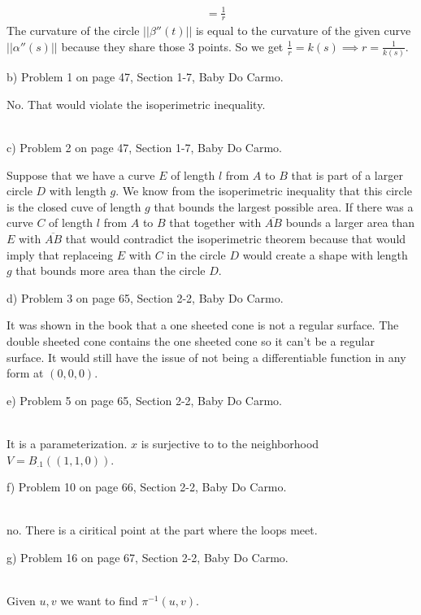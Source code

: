 \documentclass[12pt,letterpaper,boxed]{hmcpset}
\begin{document}
\begin{itemize}
\begin{solution}
\begin{align*}
             &= \frac{1}{r}
  \end{align*}
  The curvature of the circle $||\beta''(t)||$ is equal to the curvature of the
  given curve $||\alpha''(s)||$ because they share those 3 points. So we get
  $\frac{1}{r} = k(s) \implies r = \frac{1}{k(s)}$.
\end{solution}
{\item b) Problem 1 on page 47, Section 1-7, Baby Do Carmo.}
\begin{solution}
  No. That would violate the isoperimetric inequality. \\\\
\end{solution}
{\item c) Problem 2 on page 47, Section 1-7, Baby Do Carmo.}
\begin{solution}
Suppose that we have a curve $E$ of length $l$ from $A$ to $B$ that is part of a larger circle $D$ with length $g$. We know from the isoperimetric
inequality that this circle is the closed cuve of length $g$ that bounds the
largest possible area. If there was a curve $C$ of length $l$ from $A$ to $B$ that together
with $\overline{AB}$ bounds a larger area than $E$ with $\overline{AB}$ that would
contradict the isoperimetric theorem because that would imply that replaceing
$E$ with $C$ in the circle $D$ would create a shape with length $g$ that bounds
more area than the circle $D$.
\end{solution}
{\item d) Problem 3 on page 65, Section 2-2, Baby Do Carmo.}
\begin{solution}
 It was shown in the book that a one sheeted cone is not a regular surface. The
 double sheeted cone contains the one sheeted cone so it can't be a regular
 surface.
 It would still have the issue of not being a differentiable function in any
 form at $(0, 0, 0)$.
\end{solution}
{\item e) Problem 5 on page 65, Section 2-2, Baby Do Carmo.} \\
It is a parameterization. $x$ is surjective to to the neighborhood $V =
B_{.1}((1, 1, 0))$. 
{\item f) Problem 10 on page 66, Section 2-2, Baby Do Carmo.} \\
no. There is a ciritical point at the part where the loops meet.
{\item g) Problem 16 on page 67, Section 2-2, Baby Do Carmo.}\\
Given $u, v$ we want to find $\pi^{-1}(u, v)$.

\end{itemize}
\end{document}
